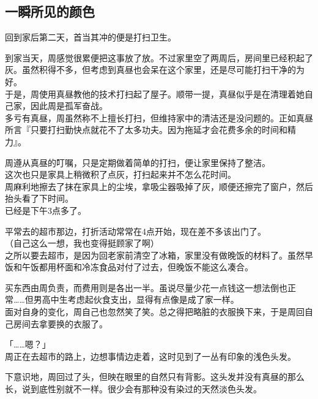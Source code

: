 \subsection{一瞬所见的颜色}

回到家后第二天，首当其冲的便是打扫卫生。

到家当天，周感觉很累便把这事放了放。不过家里空了两周后，房间里已经积起了灰。虽然积得不多，但考虑到真昼也会呆在这个家里，还是尽可能打扫干净的为好。\\

于是，周使用真昼教他的技术打扫起了屋子。顺带一提，真昼似乎是在清理着她自己家，因此周是孤军奋战。\\

多亏有真昼，周虽然称不上擅长打扫，但维持家中的清洁还是没问题的。正如真昼所言『只要打扫勤快点就花不了太多功夫。因为拖延才会花费多余的时间和精力』。

周遵从真昼的叮嘱，只是定期做着简单的打扫，便让家里保持了整洁。\\

这次也只是家具上稍微积了点灰，打扫起来并不怎么花时间。\\

周麻利地擦去了抹在家具上的尘埃，拿吸尘器吸掉了灰，顺便还擦完了窗户，然后抬头看了下时间。\\

已经是下午3点多了。

平常去的超市那边，打折活动常常在4点开始，现在差不多该出门了。\\

（自己这么一想，我也变得挺顾家了啊）\\

之所以要去超市，是因为回老家前清空了冰箱，家里没有做晚饭的材料了。虽然早饭和午饭都用杯面和冷冻食品对付了过去，但晚饭不能这么凑合。

买东西由周负责，而费用则是各出一半。虽说尽量少花一点钱这一想法倒也正常……但男高中生考虑起伙食支出，显得有点像是成了家一样。\\

面对自身的变化，周自己也忽然笑了笑。总之得把略脏的衣服换下来，于是周回自己房间去拿要换的衣服了。\\

\vspace{2\baselineskip}

「……嗯？」\\

周正在去超市的路上，边想事情边走着，这时见到了一丛有印象的浅色头发。

下意识地，周回过了头，但映在眼里的自然只有背影。这头发并没有真昼的那么长，说到底性别就不一样。很少会有那种没有染过的天然淡色头发。\\

